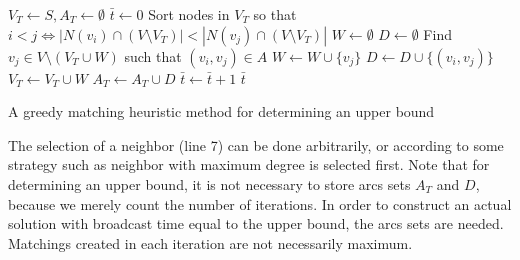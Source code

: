 \begin{algorithm}[]
$V_T\leftarrow S, A_T \leftarrow \emptyset$\;
$\bar{t}\leftarrow 0$\;
 {
	Sort nodes in $V_T$ so that $i<j\Leftrightarrow |N(v_i)\cap(V\setminus V_T)|<|N(v_j)\cap (V\setminus V_T)|$\;
	$W\leftarrow\emptyset$\;
	$D\leftarrow\emptyset$\;
	 {
		Find $v_j\in V\setminus (V_T\cup W)$ such that $(v_i,v_j)\in A$\;
		$W\leftarrow W\cup\{v_j\}$\;
		$D\leftarrow D\cup\{\left(v_i,v_j\right)\}$\;
	}
	$V_T\leftarrow V_T\cup W$\;
	$A_T\leftarrow A_T\cup D$\;
	$\bar{t}\leftarrow \bar{t}+1$\;
}
\Return $\bar{t}$\;
 \caption{A greedy matching heuristic method for determining an upper bound}
\label{alg:matchheur}
\end{algorithm}
The selection of a neighbor (line 7) can be done arbitrarily, or according to some strategy such as neighbor with maximum degree is selected first.
Note that for determining an upper bound, it is not necessary to store arcs sets $A_T$ and $D$, because we merely count the number of iterations.
In order to construct an actual solution with broadcast time equal to the upper bound, the arcs sets are needed.
Matchings created in each iteration are not necessarily maximum.


